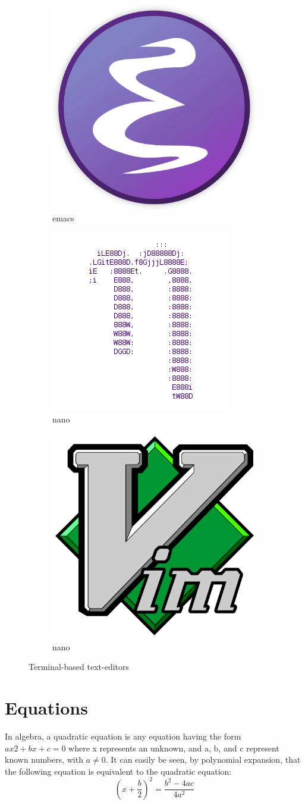 \documentclass[12pt, a4paper]{article} %
\begin{document}
	\begin{figure}[h!]
	\begin{subfigure}{.33\textwidth}
		\centering
		\includegraphics[width=.4\linewidth]{emacslogo.png}
		\caption{emacs}
		\label{fig:sfig1}
	\end{subfigure}%
	\begin{subfigure}{.33\textwidth}
		\centering
		\includegraphics[width=.4\linewidth]{nanologo.png}
		\caption{nano}
		\label{fig:sfig2}
	\end{subfigure}
	\begin{subfigure}{.33\textwidth}
		\centering
		\includegraphics[width=.4\linewidth]{vimlogo.png}
		\caption{nano}
		\label{fig:sfig2}
	\end{subfigure}
\caption{ Terminal-based text-editors
}
\end{figure}

\section{Equations}
In algebra, a quadratic equation is any equation having the form $ax2 +bx+c = 0$
where x represents an unknown, and a, b, and c represent known numbers, with
$a \neq 0$. It can easily be seen, by polynomial expansion, that the following
equation is equivalent to the quadratic equation:
$$\left(x+\frac{b}{2}\right)^2 = \frac{b^2 - 4ac}{4a^2}$$
\end{document}
